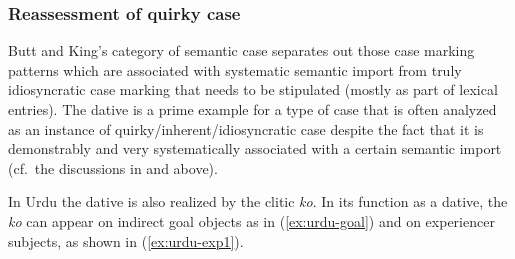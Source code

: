 \documentclass[output=paper,hidelinks]{langscibook}
\begin{document}




\subsubsection{Reassessment of quirky case}

Butt and King's category of semantic case separates out those case marking patterns which
are associated with systematic semantic import from truly idiosyncratic case
marking that needs to be stipulated (mostly as part of lexical entries). The
dative is a prime example for a type of  case that is often analyzed as an
instance of quirky/inherent/idiosyncratic case despite the fact that it is
demonstrably and very systematically associated  with a certain semantic import
(cf.~the discussions in  and  above). 

In Urdu the dative is also realized by the clitic {\em ko}.  In its function as
a dative, the {\em ko} can appear on indirect goal objects as in
(\ref{ex:urdu-goal}) and on experiencer subjects, as shown in
(\ref{ex:urdu-exp1}).
\end{document}
